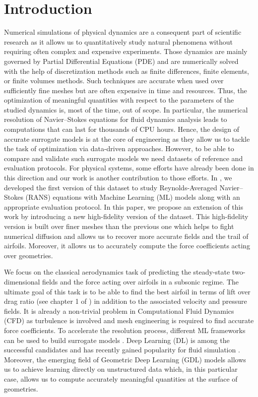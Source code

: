 \section{Introduction}
Numerical simulations of physical dynamics are a consequent part of scientific research as it allows us to quantitatively study natural phenomena without requiring often complex and expensive experiments. Those dynamics are mainly governed by Partial Differential Equations (PDE) and are numerically solved with the help of discretization methods such as finite differences, finite elements, or finite volumes methods. Such techniques are accurate when used over sufficiently fine meshes but are often expensive in time and resources. Thus, the optimization of meaningful quantities with respect to the parameters of the studied dynamics is, most of the time, out of scope. In particular, the numerical resolution of Navier–Stokes equations for fluid dynamics analysis leads to computations that can last for thousands of CPU hours. Hence, the design of accurate surrogate models is at the core of engineering as they allow us to tackle the task of optimization via data-driven approaches. However, to be able to compare and validate such surrogate models we need datasets of reference and evaluation protocols. For physical systems, some efforts have already been done in this direction \cite{otness2021an,bonnet2022an} and our work is another contribution to those efforts. In \cite{bonnet2022an}, we developed the first version of this dataset to study Reynolds-Averaged Navier–Stokes (RANS) equations with Machine Learning (ML) models along with an appropriate evaluation protocol. In this paper, we propose an extension of this work by introducing a new high-fidelity version of the dataset. This high-fidelity version is built over finer meshes than the previous one which helps to fight numerical diffusion and allows us to recover more accurate fields and the trail of airfoils. Moreover, it allows us to accurately compute the force coefficients acting over geometries.

We focus on the classical aerodynamics task of predicting the steady-state two-dimensional fields and the force acting over airfoils in a subsonic regime. The ultimate goal of this task is to be able to find the best airfoil in terms of lift over drag ratio (see chapter 1 of \cite{aero}) in addition to the associated velocity and pressure fields. It is already a non-trivial problem in Computational Fluid Dynamics (CFD) as turbulence is involved and mesh engineering is required to find accurate force coefficients. To accelerate the resolution process, different ML frameworks can be used to build surrogate models \cite{surrogate2020, surrogate2008}. Deep Learning (DL) is among the successful candidates and has recently gained popularity for fluid simulation \cite{thuerey2020deepFlowPred}. Moreover, the emerging field of Geometric Deep Learning (GDL) \cite{DBLP:journals/spm/BronsteinBLSV17} models allows us to achieve learning directly on unstructured data \cite{pfaff2021learning} which, in this particular case, allows us to compute accurately meaningful quantities at the surface of geometries.

